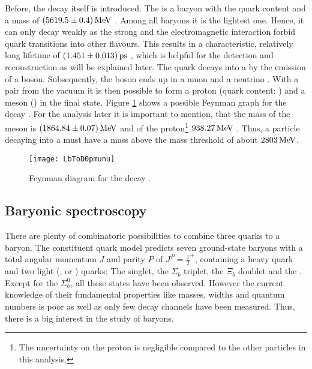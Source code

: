Before, the decay \LbToDpmunuX itself is introduced.
The \Lb is a baryon with the quark content \uquark\dquark\bquark and a mass of $(5619.5 \pm 0.4)\mathrm{\,Me\kern -0.1em V}$ \cite{PDG}.
Among all \bquark baryons it is the lightest one.
Hence, it can only decay weakly as the strong and the electromagnetic interaction forbid quark transitions into other flavours.
This results in a characteristic, relatively long lifetime of $(1.451 \pm 0.013){\rm \,ps}$ \cite{PDG}, which is helpful for the detection and reconstruction as will be explained later.
The \bquark quark decays into a \cquark by the emission of a \Wm boson.
Subsequently, the \Wm boson ends up in a muon \mun and a neutrino \neumb.
With a \uubar pair from the vacuum it is then possible to form a proton \proton (quark content: \uquark\uquark\dquark) and a \Dz meson (\cquark\uquarkbar) in the final state.
Figure \ref{fig:LbToDpmunu} shows a possible Feynman graph for the decay \LbToDpmunu.
For the analysis later it is important to mention, that the mass of the \Dz meson is $(1864.84 \pm 0.07)\mathrm{\,Me\kern -0.1em V}$ and of the proton\footnote{The uncertainty on the proton is negligible compared to the other particles in this analysis.} $938.27\mathrm{\,Me\kern -0.1em V}$ \cite{PDG}.
Thus, a particle decaying into a \Dz\proton must have a mass above the \Dz\proton mass threshold of about $2803\mathrm{\,Me\kern -0.1em V}$.
\begin{figure}[tb]
    \centering
	\texttt{[image: LbToD0pmunu]}	
	\caption{Feynman diagram for the decay \LbToDpmunu.}
	\label{fig:LbToDpmunu}
\end{figure}

\subsection{Baryonic spectroscopy}
There are plenty of combinatoric possibilities to combine three quarks to a baryon.
The constituent quark model predicts seven ground-state baryons with a total angular momentum $J$ and parity $P$ of $J^P = \frac{1}{2}^+$, containing a heavy \bquark quark and two light (\uquark, \dquark or \squark) quarks: 
The \Lb singlet, the $\Sigma_b$ triplet, the $\Xi_b$ doublet and the \Omegab \cite{LHCb_Dph}.
Except for the $\Sigma_b^0$, all these states have been observed.
However the current knowledge of their fundamental properties like masses, widths and quantum numbers is poor as well as only few decay channels have been measured.
Thus, there is a big interest in the study of \bquark baryons.

